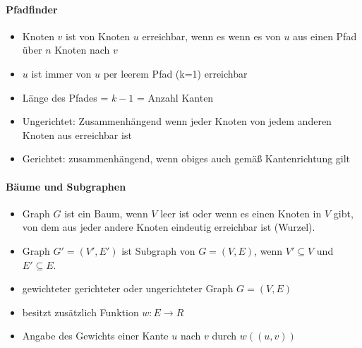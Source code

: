 \documentclass[
    ngerman,
    color=3b,
    dark_mode,
    load_common, %
    summary,
    boxarc,
]{tuda_summary}
\begin{document}
\paragraph{Pfadfinder}\mbox{}
\begin{grayInfoBox}
    \begin{itemize}
        \item Knoten $v$ ist von Knoten $u$ erreichbar, wenn es wenn es von $u$ aus einen Pfad über $n$ Knoten nach $v$
        \item $u$ ist immer von $u$ per leerem Pfad (k=1) erreichbar
        \item Länge des Pfades = $k - 1$ = Anzahl Kanten
    \end{itemize}
\end{grayInfoBox}

\begin{definition}\mbox{}
    \begin{itemize}
        \item Ungerichtet: Zusammenhängend wenn jeder Knoten von jedem anderen Knoten aus erreichbar ist
        \item Gerichtet:  zusammenhängend, wenn obiges auch gemäß Kantenrichtung gilt
    \end{itemize}
\end{definition}

\paragraph{Bäume und Subgraphen}\mbox{}
\begin{grayInfoBox}
    \begin{itemize}
        \item Graph $G$ ist ein Baum, wenn $V$ leer ist oder wenn es einen Knoten in $V$ gibt,
              von dem aus jeder andere Knoten eindeutig erreichbar ist (Wurzel).
        \item Graph $G'=(V',E')$ ist Subgraph von $G=(V,E)$, wenn $V'\subseteq V$ und $E' \subseteq E$.
    \end{itemize}
\end{grayInfoBox}

\begin{definition}\mbox{}
    \begin{itemize}
        \item gewichteter gerichteter oder ungerichteter Graph $G=(V,E)$
        \item besitzt zusätzlich Funktion $w: E \rightarrow R$
        \item Angabe des Gewichts einer Kante $u$ nach $v$ durch $w((u,v))$
    \end{itemize}
\end{definition}
\clearpage
\end{document}
